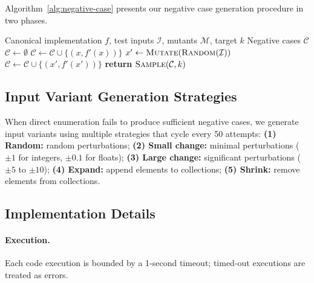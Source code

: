 Algorithm~\ref{alg:negative-case} presents our negative case generation procedure in two phases.

\begin{algorithm}[H]
\caption{Negative Case Generation via Mutation Testing}
\label{alg:negative-case}
\begin{algorithmic}[1]
\REQUIRE Canonical implementation $f$, test inputs $\mathcal{I}$, mutants $\mathcal{M}$, target $k$
\ENSURE Negative cases $\mathcal{C}$
\STATE $\mathcal{C} \gets \emptyset$
\STATE {}
            \STATE $\mathcal{C} \gets \mathcal{C} \cup \{(x, f'(x))\}$
        \ENDIF
    \ENDFOR
\ENDFOR
\STATE
\STATE {}
    \STATE $x' \gets \textsc{Mutate}(\textsc{Random}(\mathcal{I}))$
            \STATE $\mathcal{C} \gets \mathcal{C} \cup \{(x', f'(x'))\}$
        \ENDIF
    \ENDFOR
\ENDWHILE
\STATE
\STATE \textbf{return} $\textsc{Sample}(\mathcal{C}, k)$
\end{algorithmic}
\end{algorithm}

\subsection{Input Variant Generation Strategies}

When direct enumeration fails to produce sufficient negative cases, we generate input variants using multiple strategies that cycle every 50 attempts:
\textbf{(1) Random:} random perturbations;
\textbf{(2) Small change:} minimal perturbations ($\pm 1$ for integers, $\pm 0.1$ for floats);
\textbf{(3) Large change:} significant perturbations ($\pm 5$ to $\pm 10$);
\textbf{(4) Expand:} append elements to collections;
\textbf{(5) Shrink:} remove elements from collections.

\subsection{Implementation Details}

\paragraph{Execution.} Each code execution is bounded by a 1-second timeout; timed-out executions are treated as errors.

